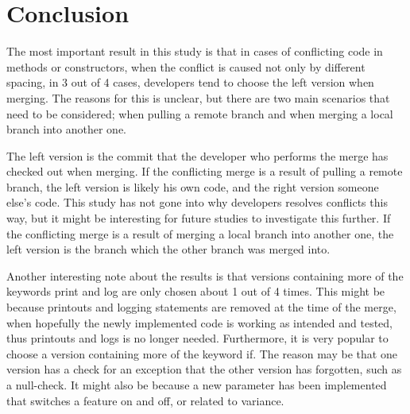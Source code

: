 \chapter{Conclusion}
The most important result in this study is that in cases of conflicting code in methods or constructors, when the conflict is caused not only by different spacing, in 3 out of 4 cases, developers tend to choose the left version when merging. The reasons for this is unclear, but there are two main scenarios that need to be considered; when pulling a remote branch and when merging a local branch into another one.

The left version is the commit that the developer who performs the merge has checked out when merging. If the conflicting merge is a result of pulling a remote branch, the left version is likely his own code, and the right version someone else’s code. This study has not gone into why developers resolves conflicts this way, but it might be interesting for future studies to investigate this further. If the conflicting merge is a result of merging a local branch into another one, the left version is the branch which the other branch was merged into.

Another interesting note about the results is that versions containing more of the keywords print and log are only chosen about 1 out of 4 times. This might be because printouts and logging statements are removed at the time of the merge, when hopefully the newly implemented code is working as intended and tested, thus printouts and logs is no longer needed. Furthermore, it is very popular to choose a version containing more of the keyword if. The reason may be that one version has a check for an exception that the other version has forgotten, such as a null-check. It might also be because a new parameter has been implemented that switches a feature on and off, or related to variance.





